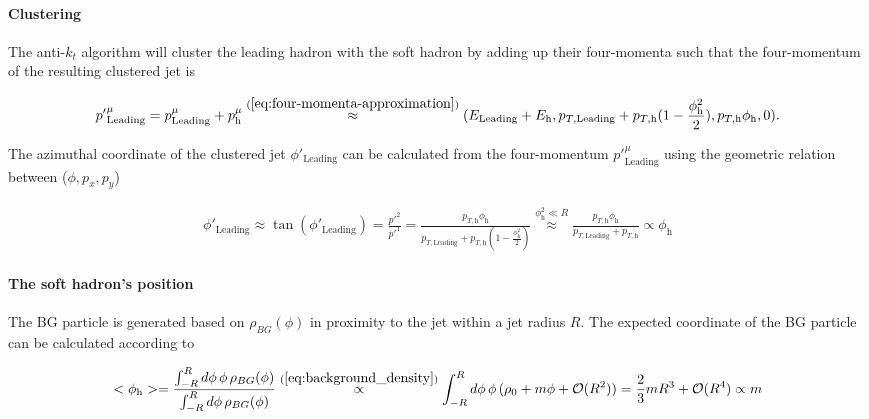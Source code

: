 \documentclass[
  a4paper,
  12pt,
  oneside,
  parskip=half,
  listof=totoc,
  bibliography=totoc,
  DIV=12,
  numbers=noenddot,
  BA.tex
  ]{subfiles}
\begin{document}
\paragraph{Clustering}

The anti-$k_t$ algorithm will cluster the leading hadron with the soft hadron by adding up their four-momenta such that the four-momentum of the resulting clustered jet is

\begin{equation}
	\begin{gathered}
		{p'}^\mu_{\text{Leading}} = p_\text{Leading}^\mu + p_\text{h}^\mu \stackrel{(\ref{eq:four-momenta-approximation})}{\approx} (E_\text{Leading} + E_\text{h}, p_{T,\text{Leading}} + p_{T,\text{h}}(1 - \frac{\phi_\text{h}^2}{2}), p_{T,\text{h}} \phi_\text{h}, 0) .
	\end{gathered}
\end{equation}

The azimuthal coordinate of the clustered jet $\phi'_\text{Leading}$ can be calculated from the four-momentum ${p'}^\mu_{\text{Leading}}$ using the geometric relation between ($\phi, p_x, p_y$)

\begin{equation}
	\begin{gathered}
		\phi'_\text{Leading} \approx \tan(\phi'_\text{Leading}) = \frac{{p'}^2}{{p'}^1} = \frac{p_{T,\text{h}} \phi_\text{h}}{p_{T,\text{Leading}} + p_{T,\text{h}} (1-\frac{\phi_\text{h}^2}{2})} \stackrel{\phi_\text{h}^2 \ll R}{\approx} \frac{p_{T,\text{h}} \phi_\text{h}}{p_{T,\text{Leading}} + p_{T,\text{h}} } \propto \phi_\text{h}
	\end{gathered}
\end{equation}

\paragraph{The soft hadron's position}

The BG particle is generated based on $\rho_{BG}(\phi)$ in proximity to the jet within a jet radius $R$. The expected coordinate of the BG particle can be calculated according to

\begin{equation}
	\begin{gathered}
		<\phi_\text{h}> = \frac{\int_{-R}^{R} d\phi \, \phi \, \rho_{BG}(\phi)}{\int_{-R}^{R} d\phi \,  \rho_{BG}(\phi)} \stackrel{(\ref{eq:background_density})}{\propto} \int_{-R}^{R} d\phi \, \phi \, (\rho_0 + m \phi + \mathcal{O}(R^2)) = \frac{2}{3} m R^3 + \mathcal{O}(R^4) \propto m
	\end{gathered}
\end{equation}
\end{document}
